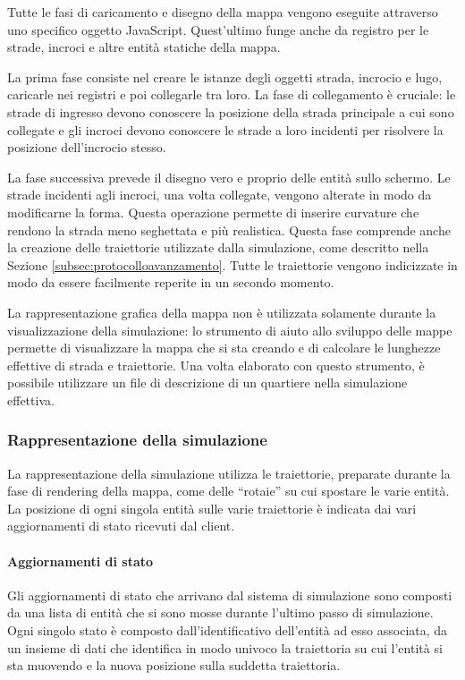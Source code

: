 Tutte le fasi di caricamento e disegno della mappa vengono eseguite attraverso
uno specifico oggetto JavaScript. Quest'ultimo funge anche da registro per
le strade, incroci e altre entità statiche della mappa.

La prima fase consiste nel creare le istanze degli oggetti strada, incrocio e
lugo, caricarle nei registri e poi collegarle tra loro. La fase di collegamento
è cruciale: le strade di ingresso devono conoscere la posizione della strada
principale a cui sono collegate e gli incroci devono conoscere le strade a loro
incidenti per risolvere la posizione dell'incrocio stesso.

La fase successiva prevede il disegno vero e proprio delle entità sullo schermo.
Le strade incidenti agli incroci, una volta collegate, vengono alterate in modo
da modificarne la forma. Questa operazione permette di inserire curvature che
rendono la strada meno seghettata e più realistica.
Questa fase comprende anche la creazione delle traiettorie utilizzate dalla
simulazione, come descritto nella Sezione \ref{subsec:protocolloavanzamento}.
Tutte le traiettorie vengono indicizzate in modo da essere facilmente reperite
in un secondo momento.

La rappresentazione grafica della mappa non è utilizzata solamente durante la
visualizzazione della simulazione: lo strumento di aiuto allo sviluppo delle
mappe permette di visualizzare la mappa che si sta creando e di calcolare le
lunghezze effettive di strada e traiettorie.
Una volta elaborato con questo strumento, è possibile utilizzare un file di
descrizione di un quartiere nella simulazione effettiva.

\subsubsection{Rappresentazione della simulazione}
La rappresentazione della simulazione utilizza le traiettorie, preparate durante
la fase di rendering della mappa, come delle ``rotaie'' su cui spostare le varie
entità. La posizione di ogni singola entità sulle varie traiettorie è indicata
dai vari aggiornamenti di stato ricevuti dal client.

\paragraph*{Aggiornamenti di stato}
Gli aggiornamenti di stato che arrivano dal sistema di simulazione sono composti
da una lista di entità che si sono mosse durante l'ultimo passo di simulazione. 
Ogni singolo stato è composto dall'identificativo dell'entità ad esso associata,
da un insieme di dati che identifica in modo univoco la traiettoria su cui
l'entità si sta muovendo e la nuova posizione sulla suddetta traiettoria.

